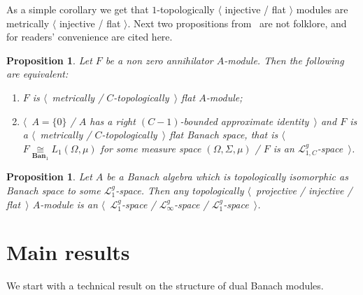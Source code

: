 \documentclass[12pt]{article}
\newtheorem{proposition}[theorem]{Proposition}
\newcommand{\isom}[1]{\mathop{\mathbin{\cong}}\limits_{#1}}
\begin{document}
As a simple corollary we get that $1$-topologically $\langle$ injective / flat
$\rangle$ modules are metrically $\langle$ injective / flat $\rangle$.  Next two
propositions from~\cite{NemGeomProjInjFlatBanMod} are not folklore, and for
readers' convenience are cited here.
\begin{proposition}\label{MetTopFlatAnnihModCharac} Let $F$ be a non zero
annihilator $A$-module. Then the following are equivalent:
\begin{enumerate}[label = (\roman*)]
\item $F$ is $\langle$~metrically / $C$-topologically~$\rangle$ flat $A$-module;
\item $\langle$~$A= \{0 \}$ / $A$ has a right $(C-1)$-bounded approximate
identity~$\rangle$ and $F$ is a $\langle$~metrically /
$C$-topologically~$\rangle$ flat Banach space, that is
$\langle$~$F\isom{\mathbf{Ban}_1}L_1(\Omega,\mu)$ for some measure space
$(\Omega, \Sigma, \mu)$ / $F$ is an $\mathcal{L}_{1,C}^g$-space~$\rangle$.
\end{enumerate}
\end{proposition}

\begin{proposition}\label{TopProjInjFlatModOverMthscrL1SpCharac} Let $A$ be a
Banach algebra which is topologically isomorphic as Banach space to some
$\mathcal{L}_1^g$-space. Then any topologically $\langle$~projective / injective
/ flat~$\rangle$ $A$-module is an $\langle$~$\mathcal{L}_1^g$-space /
$\mathcal{L}_\infty^g$-space / $\mathcal{L}_1^g$-space~$\rangle$.
\end{proposition}


\section{Main results}\label{SectionMainResults}

We start with a technical result on the structure of dual Banach modules.
\end{document}
